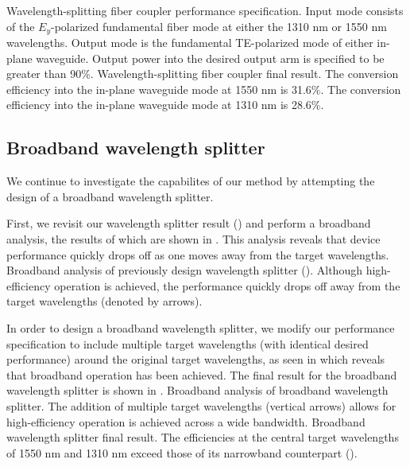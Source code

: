 \documentclass[letterpaper,10pt]{article}
\begin{document}
    {Wavelength-splitting fiber coupler performance specification.
    Input mode consists of the $E_y$-polarized fundamental fiber mode at either
        the 1310 nm or 1550 nm wavelengths.
    Output mode is the fundamental TE-polarized mode of either in-plane waveguide.
    Output power into the desired output arm is specified to be greater than 90\%.}
    {Wavelength-splitting fiber coupler final result.
    The conversion efficiency into the in-plane waveguide mode at 1550 nm is 31.6\%.
    The conversion efficiency into the in-plane waveguide mode at 1310 nm is 28.6\%.}

\subsection{Broadband wavelength splitter}
We continue to investigate the capabilites of our method
    by attempting the design of a broadband wavelength splitter.

First, we revisit our wavelength splitter result ()
    and perform a broadband analysis, 
    the results of which are shown in .
This analysis reveals that device performance quickly drops off
    as one moves away from the target wavelengths.
    {Broadband analysis of previously design wavelength splitter ().
    Although high-efficiency operation is achieved, 
    the performance quickly drops off away from the target wavelengths 
    (denoted by arrows).}

In order to design a broadband wavelength splitter,
    we modify our performance specification to include multiple target 
    wavelengths (with identical desired performance) around the 
    original target wavelengths, as seen in 
    which reveals that broadband operation has been achieved.
The final result for the broadband wavelength splitter is shown in .
    {Broadband analysis of broadband wavelength splitter.
    The addition of multiple target wavelengths (vertical arrows)
    allows for 
    high-efficiency operation is achieved across a wide bandwidth.}
    {Broadband wavelength splitter final result.
    The efficiencies at the central target wavelengths of 1550 nm and 1310 nm
    exceed those of its narrowband counterpart ().}
\end{document}
